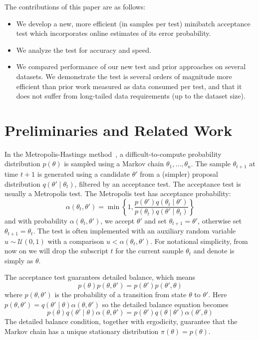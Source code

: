 \documentclass{article}
\begin{document}
The contributions of this paper are as follows:

\begin{itemize}
\item We develop a new, more efficient (in samples per test) minibatch acceptance test which incorporates
online  estimates of its error probability.
\item We analyze the test for accuracy and speed.
\item We compared performance of our new test and prior approaches on several datasets. We demonstrate the test is several orders
  of magnitude more efficient than prior work measured as data consumed per test, and that it does not suffer
  from long-tailed data requirements (up to the dataset size). 
\end{itemize}




\section{Preliminaries and Related Work}\label{sec:related_work}

In the Metropolis-Hastings method~\cite{gilks1996markov,brooks2011handbook}, a difficult-to-compute
probability distribution $p(\theta)$ is sampled using a Markov chain $\theta_1,\ldots,\theta_n$. The 
sample $\theta_{t+1}$ at time $t+1$ is generated using a candidate $\theta'$ from a (simpler) proposal
distribution $q(\theta'\mid \theta_t)$, filtered by an acceptance test. The acceptance test is usually
a Metropolis test. The Metropolis test has acceptance probability:
\begin{equation}\label{eq:traditional}
\alpha(\theta_t,\theta') = \min\left\{ 1, \frac{p(\theta')q(\theta_t \mid \theta')}{p(\theta_t)q(\theta' \mid \theta_t)}
\right\}
\end{equation}
and with probability $\alpha(\theta_t,\theta')$, we accept $\theta'$
and set $\theta_{t+1} = \theta'$, otherwise set
$\theta_{t+1}=\theta_t$.  The test is often implemented with an
auxiliary random variable $u \sim \mathcal{U}(0,1)$ with a comparison $u < \alpha(\theta_t,\theta')$.
For notational simplicity, from now on we will drop the subscript $t$ for the current sample $\theta_t$ and
denote is simply as $\theta$. 


The acceptance test guarantees detailed balance, which means
\begin{equation}\label{detailed_balance1}
  p(\theta)p(\theta,\theta') = p(\theta')p(\theta',\theta)
\end{equation}
where $p(\theta,\theta')$ is the probability of a transition from state $\theta$ to $\theta'$. Here
$p(\theta,\theta') = q(\theta'\mid\theta)\alpha(\theta,\theta')$ so the detailed balance equation becomes
\begin{equation}\label{detailed_balance2}
  p(\theta)q(\theta'\mid\theta)\alpha(\theta,\theta') = p(\theta')q(\theta\mid\theta')\alpha(\theta',\theta)
\end{equation}
The detailed balance condition, together with ergodicity, guarantee that the
Markov chain has a unique stationary distribution $\pi(\theta) = p(\theta)$.
\end{document}
